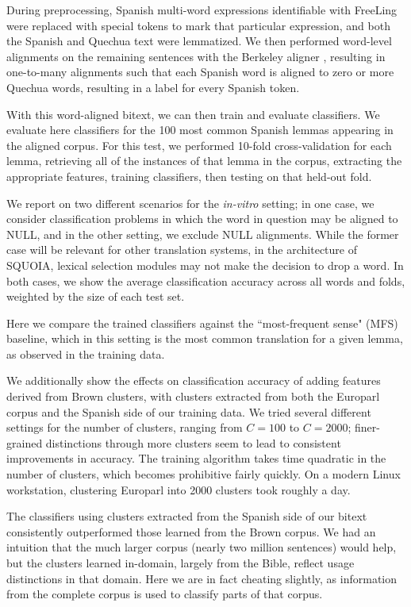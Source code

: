 \documentclass[10pt, a4paper]{article}
\begin{document}
During preprocessing, Spanish multi-word expressions identifiable with FreeLing
were replaced with special tokens to mark that particular expression, and both
the Spanish and Quechua text were lemmatized. We then performed word-level
alignments on the remaining sentences with the Berkeley aligner
\cite{denero-klein:2007:ACLMain}, resulting in one-to-many alignments such that
each Spanish word is aligned to zero or more Quechua words, resulting in a
label for every Spanish token.

With this word-aligned bitext, we can then train and evaluate classifiers.
We evaluate here classifiers for the 100 most common Spanish lemmas appearing
in the aligned corpus. For this test, we performed 10-fold cross-validation for
each lemma, retrieving all of the instances of that lemma in the corpus,
extracting the appropriate features, training classifiers, then testing on
that held-out fold.

We report on two different scenarios for the \emph{in-vitro} setting; in one
case, we consider classification problems in which the word in question may be
aligned to NULL, and in the other setting, we exclude NULL alignments. While
the former case will be relevant for other translation systems, in the
architecture of SQUOIA, lexical selection modules may not make the decision to
drop a word. In both cases, we show the average classification accuracy across
all words and folds, weighted by the size of each test set.

Here we compare the trained classifiers against the ``most-frequent sense"
(MFS) baseline, which in this setting is the most common translation for a
given lemma, as observed in the training data.

We additionally show the effects on classification accuracy of adding features
derived from Brown clusters, with clusters extracted from both the Europarl
corpus and the Spanish side of our training data. We tried several different
settings for the number of clusters, ranging from $C=100$ to $C=2000$;
finer-grained distinctions through more clusters seem to lead to consistent
improvements in accuracy.  The training algorithm takes time quadratic in the
number of clusters, which becomes prohibitive fairly quickly. On a modern Linux
workstation, clustering Europarl into 2000 clusters took roughly a day.

The classifiers using clusters extracted from the Spanish side of our bitext
consistently outperformed those learned from the Brown corpus. We had an
intuition that the much larger corpus (nearly two million sentences) would
help, but the clusters learned in-domain, largely from the Bible, reflect
usage distinctions in that domain. Here we are in fact cheating slightly, as
information from the complete corpus is used to classify parts of that corpus.
\end{document}
